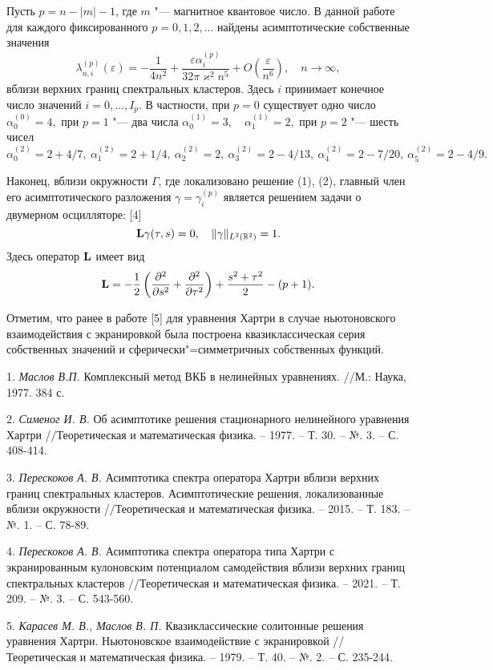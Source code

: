 Пусть $p=n- |m| -1$, где $m$ "--- магнитное квантовое число. В данной работе  для каждого фиксированного
$ p=0,1,2,\dots $  найдены асимптотические собственные значения
$$
\lambda _ {n,i}^{(p)} (\varepsilon)= -\frac {1}{4n^2}+\frac{\varepsilon  \alpha_{i}^{(p)} }
{32 \pi \varkappa^2 n^5}+O\left(\frac {\varepsilon }{n^{6}}\right), \quad  n \to \infty ,
$$
вблизи верхних границ спектральных кластеров.
Здесь $i$ принимает конечное число значений  $i=0, \dots, I_{p}$. В частности, при  $p=0$ существует одно число
$
\alpha_{0}^{(0)}=4,
$
при $p=1$ "--- два числа
$
\alpha_{0}^{(1)}=3, \quad \alpha_{1}^{(1)}=2,
$
при $p=2$ "--- шесть чисел
$
\alpha_{0}^{(2)}=2+4/7, ~ \alpha_{1}^{(2)}=2+1/4, ~ \alpha_{2}^{(2)}=2, ~ \alpha_{3}^{(2)}=2-4/13,
~ \alpha_{4}^{(2)}=2-7/20,~ \alpha_{5}^{(2)}=2-4/9.
$

Наконец,  вблизи окружности $ \Gamma $, где локализовано решение (1), (2),
главный член его асимптотического разложения $ \gamma = \gamma _i^{(p)}$ является
 решением  задачи о двумерном осцилляторе: [4]
$$
{\bf L}\gamma (\tau,s)=0, \quad  \| \gamma \|_{L^2(\mathbb{R}^2)}=1.
$$
Здесь оператор ${\bf L}$ имеет вид
\begin{equation*}
 {\bf L}= -\frac{1}{2}\left(\frac {\partial ^{2}} {\partial s^{2} } + \frac {\partial ^{2}  } {\partial \tau ^{2} }\right)
 +\frac {s^2+\tau^2}{2}-(p+1).
 \label{9}
\end{equation*}

Отметим, что ранее в работе [5] для уравнения Хартри в случае ньютоновского взаимодействия с экранировкой
 была построена квазиклассическая серия собственных значений и сферически"=симметричных
собственных функций.


\litlist

1. {\it Маслов В.П.} Комплексный метод ВКБ в нелинейных уравнениях. //М.: Наука, 1977. 384 с.

2. {\it Сименог И. В.} Об асимптотике решения стационарного нелинейного уравнения Хартри //Теоретическая
и математическая физика. – 1977. – Т. 30. – №. 3. – С. 408-414.

3. {\it Перескоков А. В.} Асимптотика спектра оператора Хар\-три вблизи верхних границ
спектральных кластеров. Асимптотические решения, локализованные вблизи окружности //Теоретическая
и математическая физика. – 2015. – Т. 183. – №. 1. – С. 78-89.

4. {\it Перескоков А. В.} Асимптотика спектра оператора типа Хартри с
экранированным кулоновским потенциалом самодействия
вблизи верхних границ спектральных кластеров  //Теоретическая
и математическая физика. – 2021. – Т. 209. – №. 3. – С. 543-560.

5. {\it Карасев М. В., Маслов В. П.} Квазиклассические солитонные решения уравнения Хартри. Ньютоновское
взаимодействие с экранировкой //Теоретическая
и математическая физика. – 1979. – Т. 40. – №. 2. – С. 235-244.

